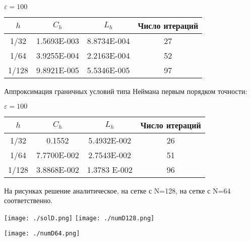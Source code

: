 \documentclass[12pt]{article}
\begin{document}
$\varepsilon = 100 $
\begin{center}
    \begin{tabular}{c|c|c|c}
      \hline
      $h$ & $C_h$ &  $L_h$ &  Число итераций \\
      \hline
      1/32 &   1.5693E-003  & 8.8734E-004  & 27  \\ 
      \hline
      1/64 &   3.9255E-004  & 2.2163E-004  & 52  \\ 
      \hline
	  1/128 &  9.8921E-005  & 5.5346E-005  & 97  \\ 
	  \hline 
    \end{tabular}
\end{center}


Аппроксимация граничных условий типа Неймана первым порядком точности:

$\varepsilon = 100 $
\begin{center}
    \begin{tabular}{c|c|c|c}
      \hline
      $h$ & $C_h$ &  $L_h$ &  Число итераций \\
      \hline
      1/32 &  0.1552  & 5.4932E-002 & 26 \\ 
      \hline
      1/64 &  7.7700E-002  & 2.7543E-002  & 51 \\ 
      \hline
	  1/128 &   3.8868E-002  & 1.3783	E-002 & 96 \\
	  \hline 
    \end{tabular}
\end{center}

\bigskip
\bigskip
На рисунках решение аналитическое, на сетке с N=128, на сетке с N=64 соответственно.

\texttt{[image: ./solD.png]}
\texttt{[image: ./numD128.png]}

\texttt{[image: ./numD64.png]}
\end{document}
